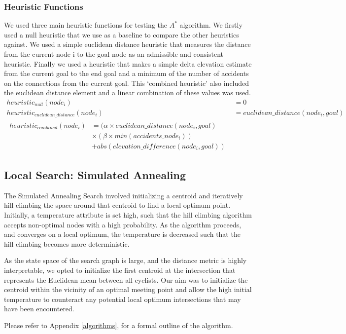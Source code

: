 \documentclass[11pt]{article}
\begin{document}
\subsubsection{Heuristic Functions}
We used three main heuristic functions for testing the $A^{*}$ algorithm. We firstly used a null heuristic that we use as a baseline to compare the other heuristics against. We used a simple euclidean distance heuristic that measures the distance from the current node i to the goal node as an admissible and consistent heuristic. Finally we used a heuristic that makes a simple delta elevation estimate from the current goal to the end goal and a minimum of the number of accidents on the connections from the current goal. This `combined heuristic' also included the euclidean distance element and a linear combination of these values was used.
\begin{align}\label{heuristic_fns}
heuristic_{null}(node_i) &= 0 \\
heuristic_{euclidean\_distance}(node_i) &= euclidean\_distance(node_i, goal)\\
\begin{split}
heuristic_{combined}(node_i) &= (\alpha \times euclidean\_distance(node_i, goal) \\ &\times  (\beta \times min(accidents\_node_i)) \\&+ abs(elevation\_difference(node_i, goal))
\end{split}
\end{align}

\subsection{Local Search: Simulated Annealing}
The Simulated Annealing Search involved initializing a centroid and iteratively hill climbing the space around that centroid to find a local optimum point. Initially, a temperature attribute is set high, such that the hill climbing algorithm accepts non-optimal nodes with a high probability. As the algorithm proceeds, and converges on a local optimum, the temperature is decreased such that the hill climbing becomes more deterministic.
\par
As the state space of the search graph is large, and the distance metric is highly interpretable, we opted to initialize the first centroid at the intersection that represents the Euclidean mean between all cyclists. Our aim was to initialize the centroid within the vicinity of an optimal meeting point and allow the high initial temperature to counteract any potential local optimum intersections that may have been encountered.
\par
Please refer to Appendix \ref{algorithms},  for a formal outline of the algorithm.
\end{document}
